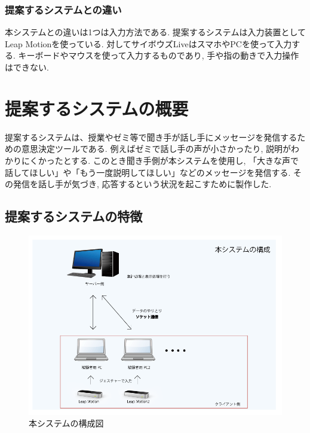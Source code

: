\documentclass{funthesis}
\begin{document}
\subsection{提案するシステムとの違い}
本システムとの違いは1つは入力方法である. 提案するシステムは入力装置としてLeap Motionを使っている. 対してサイボウズLiveはスマホやPCを使って入力する. キーボードやマウスを使って入力するものであり, 手や指の動きで入力操作はできない. 

\chapter{提案するシステムの概要}

提案するシステムは、授業やゼミ等で聞き手が話し手にメッセージを発信するための意思決定ツールである.  例えばゼミで話し手の声が小さかったり, 説明がわかりにくかったとする.  このとき聞き手側が本システムを使用し, 「大きな声で話してほしい」や「もう一度説明してほしい」などのメッセージを発信する. その発信を話し手が気づき, 応答するという状況を起こすために製作した. 

\section{提案するシステムの特徴}
\begin{figure}[H]
  \begin{center}
  \includegraphics[width=120mm]{./img/kosei2.png}
  \end{center}
  \caption{本システムの構成図}
  \label{kosei2}
 \end{figure}
\end{document}
